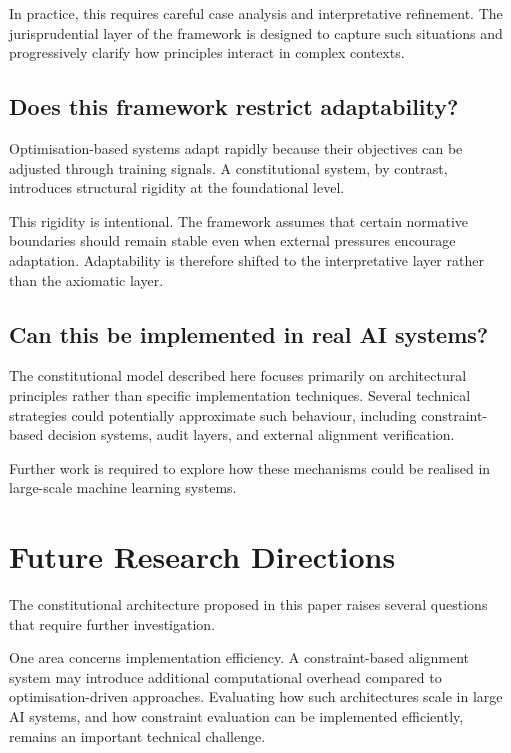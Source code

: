 \documentclass[11pt]{article}
\begin{document}
In practice, this requires careful case analysis and interpretative refinement. The jurisprudential layer of the framework is designed to capture such situations and progressively clarify how principles interact in complex contexts.

\subsection{Does this framework restrict adaptability?}

Optimisation-based systems adapt rapidly because their objectives can be adjusted through training signals. A constitutional system, by contrast, introduces structural rigidity at the foundational level.

This rigidity is intentional. The framework assumes that certain normative boundaries should remain stable even when external pressures encourage adaptation. Adaptability is therefore shifted to the interpretative layer rather than the axiomatic layer.

\subsection{Can this be implemented in real AI systems?}

The constitutional model described here focuses primarily on architectural principles rather than specific implementation techniques. Several technical strategies could potentially approximate such behaviour, including constraint-based decision systems, audit layers, and external alignment verification.

Further work is required to explore how these mechanisms could be realised in large-scale machine learning systems.

\section{Future Research Directions}

The constitutional architecture proposed in this paper raises several questions that require further investigation.

One area concerns implementation efficiency. A constraint-based alignment system may introduce additional computational overhead compared to optimisation-driven approaches. Evaluating how such architectures scale in large AI systems, and how constraint evaluation can be implemented efficiently, remains an important technical challenge.
\end{document}
